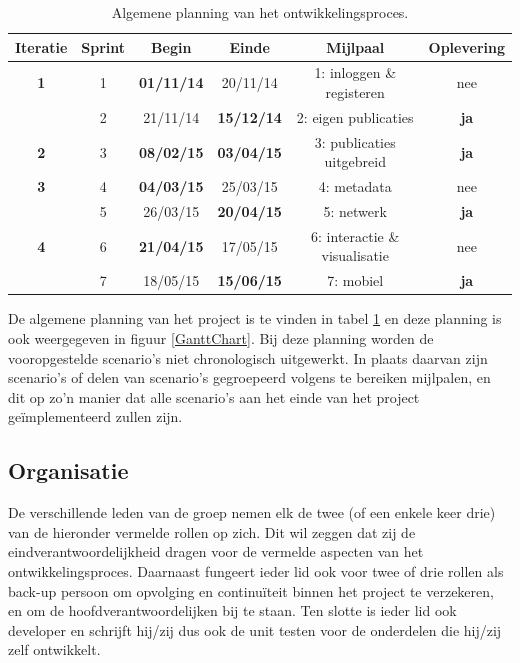 \documentclass{article}
\begin{document}
\begin{table}[h!]
\begin{center}
\begin{tabular}{||c||c||c||c||c||c||}
	\hline
	\bf{Iteratie} & \bf{Sprint}  & \bf{Begin}  & \bf{Einde}  & \bf{Mijlpaal}   & \bf{Oplevering}  
	\\
	\hline
	\bf{1} & 1 & \bf{01/11/14} & 20/11/14 & 1: inloggen \& registeren & nee \\
	& 2 & 21/11/14 & \bf{15/12/14} & 2: eigen publicaties & \bf{ja}\\
	\hline
	\bf{2} & 3 & \bf{08/02/15} & \bf{03/04/15} & 3: publicaties  uitgebreid & \bf{ja} 	\\
	\hline
	\bf{3} & 4 & \bf{04/03/15} & 25/03/15 & 4: metadata & nee \\
	& 5 & 26/03/15 & \bf{20/04/15} & 5: netwerk & \bf{ja} \\
	\hline
	\bf{4} & 6 & \bf{21/04/15} & 17/05/15 & 6: interactie \& visualisatie & nee 	\\
	& 7 & 18/05/15 & \bf{15/06/15} & 7: mobiel & \bf{ja} 	\\
	\hline
\end{tabular}
 \end{center}
 \caption{Algemene planning van het ontwikkelingsproces.}
 \label{planning}
 \end{table}
 
De algemene planning van het project is te vinden in tabel \ref{planning} en deze planning is ook weergegeven in figuur \ref{GanttChart}. Bij deze planning worden de vooropgestelde scenario's niet chronologisch uitgewerkt. In plaats daarvan zijn scenario's of delen van scenario's gegroepeerd volgens te bereiken mijlpalen, en dit op zo'n manier dat alle scenario's aan het einde van het project ge\"{i}mplementeerd zullen zijn.
 

\subsection{Organisatie}

De verschillende leden van de groep nemen elk de twee (of een enkele keer drie) van de hieronder vermelde rollen op zich. Dit wil zeggen dat zij de eindverantwoordelijkheid dragen voor de vermelde aspecten van het ontwikkelingsproces. Daarnaast fungeert ieder lid ook voor twee of drie rollen als back-up persoon om opvolging en continu\"{i}teit binnen het project te verzekeren, en om de hoofdverantwoordelijken bij te staan. Ten slotte is ieder lid ook developer en schrijft hij/zij dus ook de unit testen voor de onderdelen die hij/zij zelf ontwikkelt. 
\end{document}
